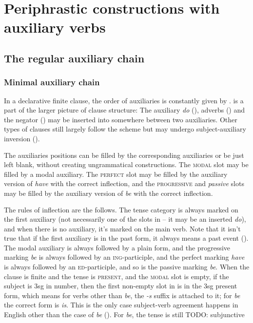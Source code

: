 \documentclass[UTF8, a4paper, oneside, scheme=plain]{ctexrep}
\newcommand{\corpus}[1]{\emph{#1}}
\newcommand{\category}[1]{\textsc{#1}}
\newcommand{\corpuscat}[1]{\textsc{#1}}
\begin{document}
\section{Periphrastic constructions with auxiliary verbs}\label{sec:auxiliaries}

\subsection{The regular auxiliary chain}\label{sec:auxiliary-chain}

\subsubsection{Minimal auxiliary chain}

In a declarative finite clause,  
the order of auxiliaries is constantly given by .
 is a part of the larger picture of clause structure:
The auxiliary \corpus{do} (), 
adverbs ()
and the negator ()
may be inserted into somewhere between two auxiliaries.
Other types of clauses still largely follow the scheme but 
may undergo subject-auxiliary inversion ().

The auxiliaries positions can be filled by the corresponding auxiliaries or be just left blank,
without creating ungrammatical constructions.
The \category{modal} slot may be filled by a modal auxiliary.
The \category{perfect} slot may be filled by the auxiliary version of \corpus{have} with the correct inflection,
and the \category{progressive} and \corpus{passive} slots 
may be filled by the auxiliary version of \corpus{be} with the correct inflection.

The rules of inflection are the follows.
The tense category is always marked on the first auxiliary
(not necessarily one of the slots in 
-- it may be an inserted \corpus{do}),
and when there is no auxiliary,
it's marked on the main verb.
Note that it isn't true that if the first auxiliary is in the past form,
it always means a past event ().
The modal auxiliary is always followed by a plain form,
and the progressive marking \corpus{be} is always followed by an \corpuscat{ing}-participle,
and the perfect marking \corpus{have} is always followed by an \corpuscat{ed}-participle,
and so is the passive marking \corpus{be}.
When the clause is finite and the tense is \category{present},
and the \category{modal} slot is empty,
if the subject is 3sg in number,
then the first non-empty slot in 
is in the 3sg present form,
which means for verbs other than \corpus{be}, the \corpus{-s} suffix is attached to it;
for \corpus{be} the correct form is \corpus{is}.
This is the only case subject-verb agreement happens in English 
other than the case of \corpus{be} ().
For \corpus{be}, the tense is still  TODO: subjunctive 
\end{document}
